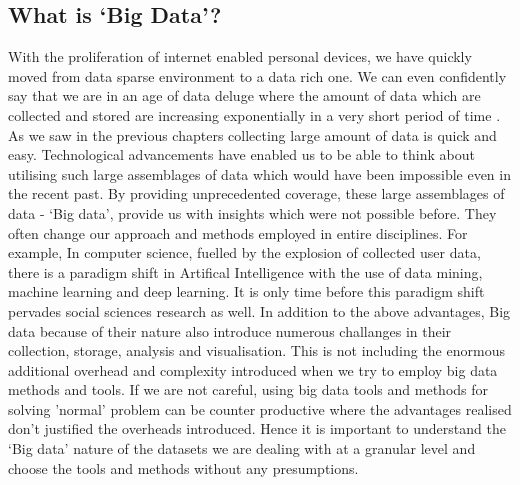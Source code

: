 
\subsection{What is `Big Data'?}

With the proliferation of internet enabled personal devices, we have quickly moved from data sparse environment to a data rich one.
We can even confidently say that we are in an age of data deluge where the amount of data which are collected and stored are increasing exponentially in a very short period of time \cite{kitchin2014big}.
As we saw in the previous chapters collecting large amount of data is quick and easy.
Technological advancements have enabled us to be able to think about utilising such large assemblages of data which would have been impossible even in the recent past.
By providing unprecedented coverage, these large assemblages of data - `Big data', provide us with insights which were not possible before.
They often change our approach and methods employed in entire disciplines.
For example, In computer science, fuelled by the explosion of collected user data, there is a paradigm shift in Artifical Intelligence with the use of data mining, machine learning and deep learning.
It is only time before this paradigm shift pervades social sciences research as well.
In addition to the above advantages, Big data because of their nature also introduce numerous challanges in their collection, storage, analysis and visualisation.
This is not including the enormous additional overhead and complexity introduced when we try to employ big data methods and tools.
If we are not careful, using big data tools and methods for solving 'normal' problem can be counter productive where the advantages realised don't justified the overheads introduced.
Hence it is important to understand the `Big data' nature of the datasets we are dealing with at a granular level and choose the tools and methods without any presumptions.

